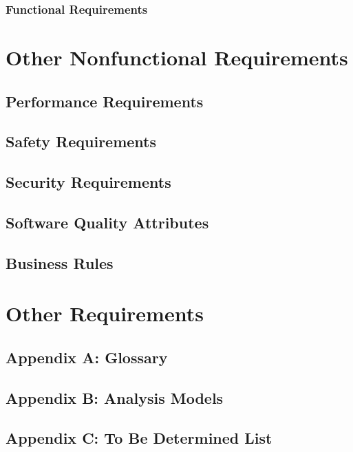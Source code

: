 \documentclass{scrreprt}
\begin{document}
\subsection{Functional Requirements}


\chapter{Other Nonfunctional Requirements}

\section{Performance Requirements}


\section{Safety Requirements}


\section{Security Requirements}


\section{Software Quality Attributes}


\section{Business Rules}



\chapter{Other Requirements}


\section{Appendix A: Glossary}


\section{Appendix B: Analysis Models}


\section{Appendix C: To Be Determined List}
\end{document}
